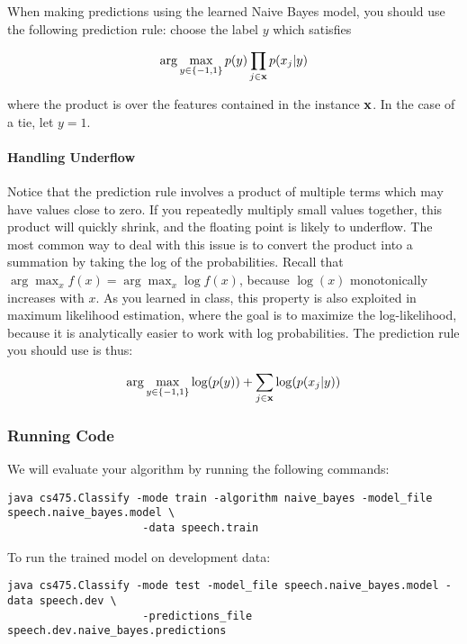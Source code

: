 \documentclass[11pt]{article}
\newcommand{\vx}{{\bf x}}
\begin{document}
When making predictions using the learned Naive Bayes model, you should use the following prediction rule: choose the label $y$ which satisfies

\begin{displaymath}
\arg\max_{y \in \{-1,1\}} p(y) \prod_{j \in \vx} p(x_j | y)
\end{displaymath}

\noindent where the product is over the features contained in the instance $\vx$. In the case of a tie, let $y=1$.

\paragraph{Handling Underflow} Notice that the prediction rule involves a product of multiple terms which may have values close to zero. If you repeatedly multiply small values together, this product will quickly shrink, and the floating point is likely to underflow. The most common way to deal with this issue is to convert the product into a summation by taking the log of the probabilities. Recall that $\arg\max_{x} f(x) = \arg\max_{x} \log f(x)$, \noindent because $\log(x)$ monotonically increases with $x$. As you learned in class, this property is also exploited in maximum likelihood estimation, where the goal is to maximize the log-likelihood, because it is analytically easier to work with log probabilities. The prediction rule you should use is thus:

\begin{displaymath}
\arg\max_{y \in \{-1,1\}} \log(p(y)) +  \sum_{j \in \vx} \log(p(x_j | y))
\end{displaymath}


\subsubsection{Running Code}
We will evaluate your algorithm by running the following commands:
\begin{footnotesize}
\begin{verbatim}
java cs475.Classify -mode train -algorithm naive_bayes -model_file speech.naive_bayes.model \
                     -data speech.train
\end{verbatim}
\end{footnotesize}
To run the trained model on development data:
\begin{footnotesize}
\begin{verbatim}
java cs475.Classify -mode test -model_file speech.naive_bayes.model -data speech.dev \
                     -predictions_file speech.dev.naive_bayes.predictions
\end{verbatim}
\end{footnotesize}
\end{document}
